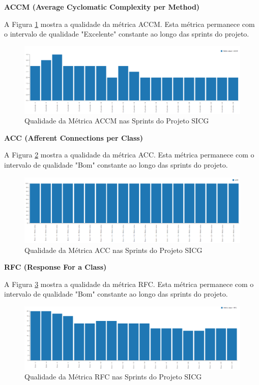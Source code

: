 \textbf{ACCM (Average Cyclomatic Complexity per Method)}

A Figura \ref{accm} mostra a qualidade da métrica ACCM. Esta métrica permanece com o intervalo de qualidade "Excelente" constante ao longo das sprints do projeto.

\begin{figure}[H]
		\centering
			\includegraphics[scale=0.4]{figuras/accm.png}
		\caption{Qualidade da Métrica ACCM nas Sprints do Projeto SICG}
		\label{accm}
\end{figure}

\textbf{ACC (Afferent Connections per Class)}

A Figura \ref{acc} mostra a qualidade da métrica ACC. Esta métrica permanece com o intervalo de qualidade "Bom" constante ao longo das sprints do projeto.

\begin{figure}[H]
		\centering
			\includegraphics[scale=0.4]{figuras/acc.png}
		\caption{Qualidade da Métrica ACC nas Sprints do Projeto SICG}
		\label{acc}
\end{figure}

\textbf{RFC (Response For a Class)} 

A Figura \ref{rfc} mostra a qualidade da métrica RFC. Esta métrica permanece com o intervalo de qualidade "Bom" constante ao longo das sprints do projeto.

\begin{figure}[H]
		\centering
			\includegraphics[scale=0.4]{figuras/rfc.png}
		\caption{Qualidade da Métrica RFC nas Sprints do Projeto SICG}
		\label{rfc}
\end{figure}

